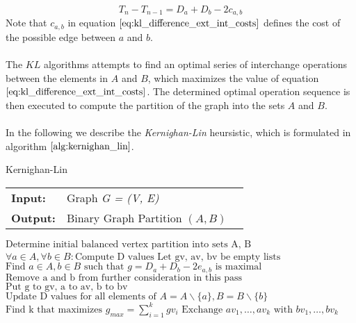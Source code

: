 \begin{equation}
	T_{n} - T_{n-1} = D_a + D_b - 2c_{a,b}
\label{eq:kl_difference_ext_int_costs}
\end{equation}
Note that $c_{a,b}$ in equation $\ref{eq:kl_difference_ext_int_costs}$ defines the cost of the possible edge between $a$ and $b$. \\ \\
The $KL$ algorithms attempts to find an optimal series of interchange operations between the elements in $A$ and $B$, which maximizes the value of equation $\ref{eq:kl_difference_ext_int_costs}$. The determined optimal operation sequence is then executed to compute the partition of the graph into the sets $A$ and $B$. \\ \\
In the following we describe the \emph{Kernighan-Lin} heursistic, which is formulated in algorithm $\ref{alg:kernighan_lin}$. 
\begin{algorithm}[H]
\caption{Kernighan-Lin}
\begin{table}[H]
  \begin{tabular}{@{}lll@{}}
    \textbf{Input:} & Graph \emph{G = (V, E)} \\
    \textbf{Output:} & Binary Graph Partition $\left( A, B \right)$ \\
  \end{tabular} 
\end{table}
\setlength{\fboxrule}{0pt} 
\begin{boxedminipage}{1.0\textwidth}
  \begin{algorithmic}[1]
  	  \State $\text{Determine initial balanced vertex partition into sets A, B}$
      \Do
		\State $\forall a \in A, \forall b \in B: \text{Compute D values}$
		\State $\text{Let gv, av, bv be empty lists}$
			\State $\text{Find } a \in A, b \in B \text{ such that } g = D_a + D_b - 2e_{a,b} \text{ is maximal}$
			\State $\text{Remove a and b from further consideration in this pass}$
			\State $\text{Put g to gv, a to av, b to bv}$
			\State $\text{Update D values for all elements of } A = A \backslash \{a\}, B = B \backslash \{b\}$
		\EndFor
		\State $\text{Find k that maximizes } g_{max} = \sum_{i=1}^k gv_i$
			\State $\text{Exchange } av_1,\dots, av_k \text{ with } bv_1,\dots, bv_k$  
		\EndIf	
  \end{algorithmic}
  \end{boxedminipage}
  \vskip1.5pt
\label{alg:kernighan_lin}
\end{algorithm}
